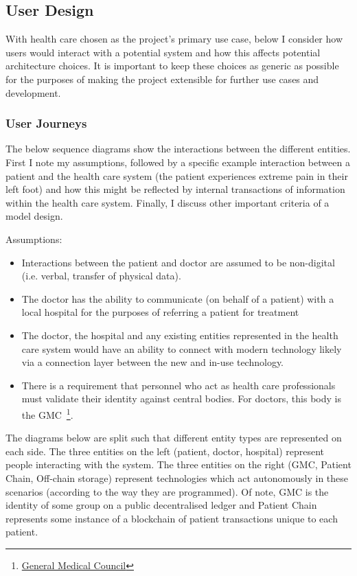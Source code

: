 \subsection{User Design}

With health care chosen as the project's primary use case, below I consider how users would interact with a potential system and how this affects potential architecture choices. It is important to keep these choices as generic as possible for the purposes of making the project extensible for further use cases and development.

\subsubsection{User Journeys}

The below sequence diagrams show the interactions between the different entities. First I note my assumptions, followed by a specific example interaction between a patient and the health care system (the patient experiences extreme pain in their left foot) and how this might be reflected by internal transactions of information within the health care system. Finally, I discuss other important criteria of a model design.

Assumptions:

\begin{itemize}
  \item Interactions between the patient and doctor are assumed to be non-digital (i.e. verbal, transfer of physical data).
  \item The doctor has the ability to communicate (on behalf of a patient) with a local hospital for the purposes of referring a patient for treatment
  \item The doctor, the hospital and any existing entities represented in the health care system would have an ability to connect with modern technology likely via a connection layer between the new and in-use technology.
  \item There is a requirement that personnel who act as health care professionals must validate their identity against central bodies. For doctors, this body is the GMC~\footnote{\href{http://www.gmc-uk.org/}{General Medical Council}}.
\end{itemize}

The diagrams below are split such that different entity types are represented on each side. The three entities on the left (patient, doctor, hospital) represent people interacting with the system. The three entities on the right (GMC, Patient Chain, Off-chain storage) represent technologies which act autonomously in these scenarios (according to the way they are programmed). Of note, GMC is the identity of some group on a public decentralised ledger and Patient Chain represents some instance of a blockchain of patient transactions unique to each patient.

